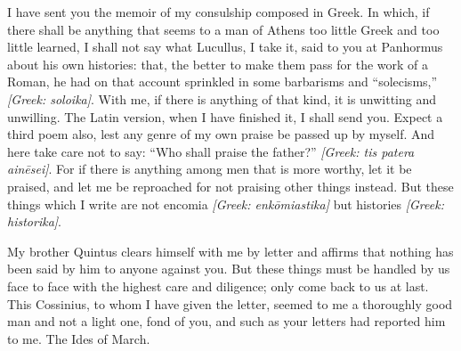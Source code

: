  I have sent you the memoir of my consulship composed in Greek. In which, if there shall be anything that seems to a man of Athens too little Greek and too little learned, I shall not say what Lucullus, I take it, said to you at Panhormus about his own histories: that, the better to make them pass for the work of a Roman, he had on that account sprinkled in some barbarisms and ``solecisms,'' \textit{[Greek: soloika]}. With me, if there is anything of that kind, it is unwitting and unwilling. The Latin version, when I have finished it, I shall send you. Expect a third poem also, lest any genre of my own praise be passed up by myself. And here take care not to say: ``Who shall praise the father?'' \textit{[Greek: tis patera ain\=esei]}. For if there is anything among men that is more worthy, let it be praised, and let me be reproached for not praising other things instead. But these things which I write are not encomia \textit{[Greek: enk\=omiastika]} but histories \textit{[Greek: historika]}.

 My brother Quintus clears himself with me by letter and affirms that nothing has been said by him to anyone against you. But these things must be handled by us face to face with the highest care and diligence; only come back to us at last. This Cossinius, to whom I have given the letter, seemed to me a thoroughly good man and not a light one, fond of you, and such as your letters had reported him to me. The Ides of March.
